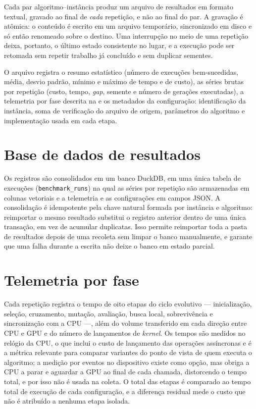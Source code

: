 Cada par algoritmo--instância produz um arquivo de resultados em formato textual, gravado ao final de \emph{cada} repetição, e não ao final do par.
A gravação é atômica: o conteúdo é escrito em um arquivo temporário, sincronizado em disco e só então renomeado sobre o destino.
Uma interrupção no meio de uma repetição deixa, portanto, o último estado consistente no lugar, e a execução pode ser retomada sem repetir trabalho já concluído e sem duplicar sementes.

O arquivo registra o resumo estatístico (número de execuções bem-sucedidas, média, desvio padrão, mínimo e máximo de tempo e de custo), as séries brutas por repetição (custo, tempo, \emph{gap}, semente e número de gerações executadas), a telemetria por fase descrita na  e os metadados da configuração: identificação da instância, soma de verificação do arquivo de origem, parâmetros do algoritmo e implementação usada em cada etapa.

\section{Base de dados de resultados}\label{apendice-banco}

Os registros são consolidados em um banco DuckDB, em uma única tabela de execuções (\texttt{benchmark\_runs}) na qual as séries por repetição são armazenadas em colunas vetoriais e a telemetria e as configurações em campos JSON.
A consolidação é idempotente pela chave natural formada por instância e algoritmo: reimportar o mesmo resultado substitui o registro anterior dentro de uma única transação, em vez de acumular duplicatas.
Isso permite reimportar toda a pasta de resultados depois de uma recoleta sem limpar o banco manualmente, e garante que uma falha durante a escrita não deixe o banco em estado parcial.

\section{Telemetria por fase}\label{apendice-telemetria}

Cada repetição registra o tempo de oito etapas do ciclo evolutivo --- inicialização, seleção, cruzamento, mutação, avaliação, busca local, sobrevivência e sincronização com a CPU ---, além do volume transferido em cada direção entre CPU e GPU e do número de lançamentos de \emph{kernel}.
Os tempos são medidos no relógio da CPU, o que inclui o custo de lançamento das operações assíncronas e é a métrica relevante para comparar variantes do ponto de vista de quem executa o algoritmo; a medição por eventos no dispositivo existe como opção, mas obriga a CPU a parar e aguardar a GPU ao final de cada chamada, distorcendo o tempo total, e por isso não é usada na coleta.
O total das etapas é comparado ao tempo total de execução de cada configuração, e a diferença residual mede o custo que não é atribuído a nenhuma etapa isolada.

